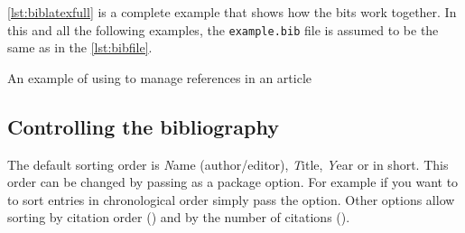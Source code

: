 \autoref{lst:biblatexfull} is a complete example that shows how the bits
work together. In this and all the following examples, the \texttt{example.bib}
file is assumed to be the same as in the \autoref{lst:bibfile}.
\begin{listing}
  \caption{An example of using  to manage references in
    an article}\label{lst:biblatexfull}
\end{listing}

\subsection{Controlling the bibliography}

The default sorting order is \emph{N}ame (author\slash{}editor), \emph{T}itle,
\emph{Y}ear or  in short. This order can be changed by passing
 as a package option. For example if you want to to sort
entries in chronological order simply pass the  option. Other options
allow sorting by citation order () and by the number of citations
().
\begin{example}[standalone,
  biber,
  paperwidth=6.5cm,
  paperheight=5.5cm,
]
\usepackage[
  sorting=ynt
]{biblatex}

\sloppy



\nocite{*}
\printbibliography[heading=none]

\end{example}

